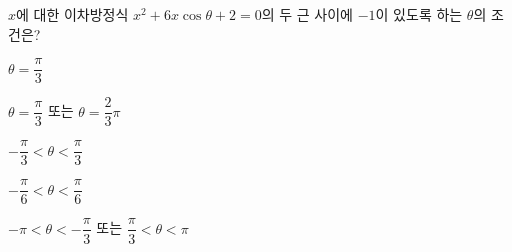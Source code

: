 $x$에 대한 이차방정식 $x^{2}+6x\cos\theta+2=0$의 두 근 사이에 $-1$이 있도록 하는 $\theta$의 조건은? \dmcondfill{$-\pi\le\theta<\pi$}{}
\begin{choicesii}{\rule[-3ex]{0pt}{8ex}$\theta=\dfrac{\pi}{3}$}{\rule[-3ex]{0pt}{8ex}$\theta=\dfrac{\pi}{3}$ 또는 $\theta=\dfrac{2}{3}\pi$}{\rule[-3ex]{0pt}{8ex}$-\dfrac{\pi}{3}<\theta<\dfrac{\pi}{3}$}{\rule[-3ex]{0pt}{8ex}$-\dfrac{\pi}{6}<\theta<\dfrac{\pi}{6}$}{\rule[-3ex]{0pt}{8ex}$-\pi<\theta<-\dfrac{\pi}{3}$ 또는 $\dfrac{\pi}{3}<\theta<\pi$}\end{choicesii}

